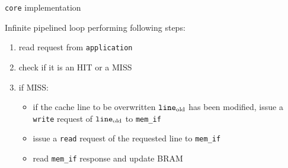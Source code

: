 \documentclass{beamer}
\begin{document}
\begin{frame}{\texttt{core} implementation}
	\begin{minipage}{.7\textwidth}
		Infinite pipelined loop performing following steps:
		\begin{enumerate}
			\item read request from \texttt{application}
			\item check if it is an HIT or a MISS
			\item if MISS: 
				\begin{itemize}
					\item if the cache line to be overwritten $\text{\texttt{line}}_{\text{old}}$
						has been modified, issue a \texttt{write}
						request of $\text{\texttt{line}}_{\text{old}}$ to \texttt{mem\_if}
					\item issue a \texttt{read} request of the
						requested line to \texttt{mem\_if}
					\item read \texttt{mem\_if} response and
						update BRAM


\end{itemize}
\end{enumerate}
\end{minipage}
\end{frame}
\end{document}
